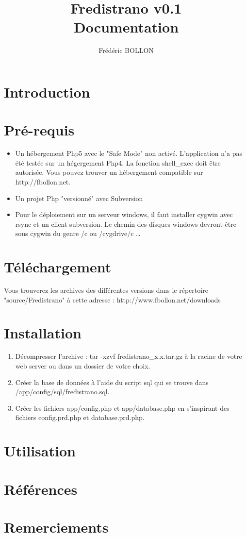 \documentclass[12pt,a4paper]{report}
\author{Frédéric BOLLON}
\title{\textbf{Fredistrano v0.1}\\Documentation}
\begin{document}
\maketitle
\tableofcontents
\chapter{Introduction}


\chapter{Pré-requis}
\begin{itemize}
\item Un hébergement Php5 avec le "Safe Mode" non activé. L'application n'a pas été testée sur un hégergement Php4. La fonction shell_exec doit être autorisée. Vous pouvez trouver un hébergement compatible sur http://fbollon.net.
\item Un projet Php "versionné" avec Subversion
\item Pour le déploiement sur un serveur windows, il faut installer cygwin avec rsync et un client subversion. Le chemin des disques windows devront être sous cygwin du genre /c ou /cygdrive/c
\dots
\end{itemize}




\chapter{Téléchargement}
Vous trouverez les archives des différentes versions dans le répertoire "source/Fredistrano" à cette adresse : http://www.fbollon.net/downloads

\chapter{Installation}
\begin{enumerate}
\item Décompresser l'archive : tar -xzvf fredistrano_x.x.tar.gz à la racine de votre web server ou dans un dossier de votre choix.
\item Créer la base de données à l'aide du script sql qui se trouve dans /app/config/sql/fredistrano.sql.
\item Créer les fichiers app/config.php et app/database.php en s'inspirant des fichiers config.prd.php et database.prd.php.
\end{enumerate}

\chapter{Utilisation}
\chapter{Références}
\chapter{Remerciements}
\end{document}
